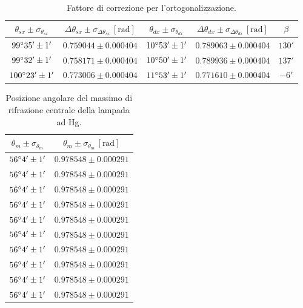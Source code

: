 \documentclass[]{article}
\begin{document}
    \begin{table}
        \centering
        \begin{tabular}{||c|c|c|c|c||}
            \hline
            $\theta_{sx} \pm \sigma_{\theta_{sx}}$ & $\Delta\theta_{sx} \pm \sigma_{\Delta\theta_{sx}} \, \left[\text{rad}\right]$ & $\theta_{dx} \pm \sigma_{\theta_{dx}}$ & $\Delta\theta_{dx} \pm \sigma_{\Delta\theta_{dx}} \, \left[\text{rad}\right]$ & $\beta$ \\\hline
            \hline
            $99\degree  35' \pm 1'$ & $0.759044 \pm 0.000404$ & $10\degree 53' \pm 1'$ & $0.789063 \pm 0.000404$ & $130'$ \\\hline
            $99\degree  32' \pm 1'$ & $0.758171 \pm 0.000404$ & $10\degree 50' \pm 1'$ & $0.789936 \pm 0.000404$ & $137'$ \\\hline
            $100\degree 23' \pm 1'$ & $0.773006 \pm 0.000404$ & $11\degree 53' \pm 1'$ & $0.771610 \pm 0.000404$ & $ -6'$ \\\hline
        \end{tabular}
        \label{prel-ort}
        \caption{Fattore di correzione per l'ortogonalizzazione.}
    \end{table}

    \begin{table}
        \centering
        \begin{tabular}{||c|c||}
            \hline
            $\theta_m \pm \sigma_{\theta_m}$ & $\theta_m \pm \sigma_{\theta_m} \, \left[\text{rad}\right]$ \\\hline
            \hline
            $56\degree 4' \pm 1'$ & $0.978548 \pm 0.000291$ \\\hline
            $56\degree 4' \pm 1'$ & $0.978548 \pm 0.000291$ \\\hline
            $56\degree 4' \pm 1'$ & $0.978548 \pm 0.000291$ \\\hline
            $56\degree 4' \pm 1'$ & $0.978548 \pm 0.000291$ \\\hline
            $56\degree 4' \pm 1'$ & $0.978548 \pm 0.000291$ \\\hline
            $56\degree 4' \pm 1'$ & $0.978548 \pm 0.000291$ \\\hline
            $56\degree 4' \pm 1'$ & $0.978548 \pm 0.000291$ \\\hline
            $56\degree 4' \pm 1'$ & $0.978548 \pm 0.000291$ \\\hline
            $56\degree 4' \pm 1'$ & $0.978548 \pm 0.000291$ \\\hline
            $56\degree 4' \pm 1'$ & $0.978548 \pm 0.000291$ \\\hline
        \end{tabular}
        \label{max-Hg}
        \caption{Posizione angolare del massimo di rifrazione centrale della lampada ad Hg.}
    \end{table}
\end{document}
